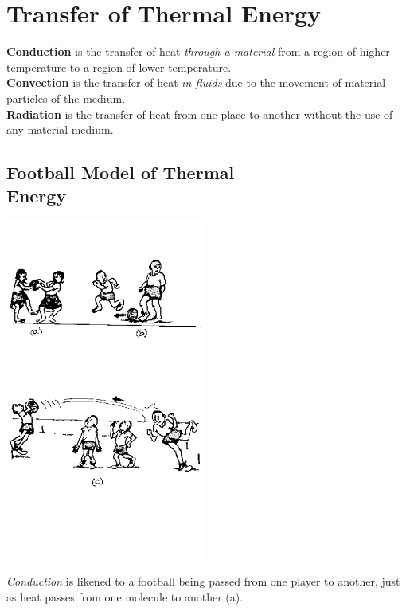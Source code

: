 \section{Transfer of Thermal Energy}  

\textbf{Conduction} is the transfer of heat \emph{through a material} from a region of higher temperature to a region of lower temperature.\\
\textbf{Convection} is the transfer of heat \emph{in fluids} due to the movement of material particles of the medium.\\
\textbf{Radiation} is the transfer of heat from one place to another without the use of any material medium.

\begin{multicols}{2}


\subsection[Football Model of Thermal Energy]{Football Model of Thermal \hfill \\ Energy}

\begin{center}
\includegraphics[width=0.49\textwidth]{./img/source/football-thermal.png}
\end{center}

\emph{Conduction} is likened to a football being passed from one player to another, just as heat passes from one molecule to another (a).


\end{multicols}
